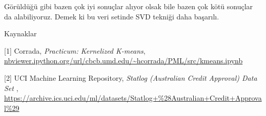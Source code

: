 \documentclass[12pt,fleqn]{article}\usepackage{../../common}
\begin{document}
Görüldüğü gibi bazen çok iyi sonuçlar alıyor olsak bile bazen çok kötü
sonuçlar da alabiliyoruz. Demek ki bu veri setinde SVD tekniği daha
başarılı. 

Kaynaklar

[1] Corrada, {\em Practicum: Kernelized K-means}, \url{nbviewer.ipython.org/url/cbcb.umd.edu/~hcorrada/PML/src/kmeans.ipynb}

[2] UCI Machine Learning Repository, {\em Statlog (Australian Credit Approval) Data Set }, \url{https://archive.ics.uci.edu/ml/datasets/Statlog+%28Australian+Credit+Approval%29}
\end{document}
